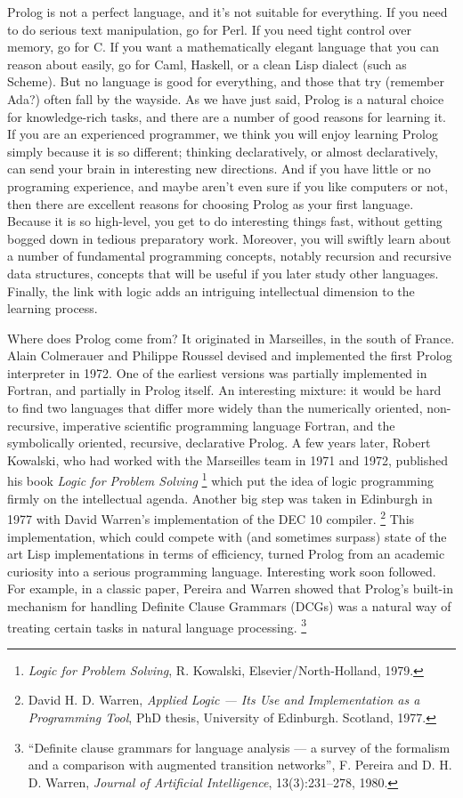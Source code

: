 Prolog is not a perfect language, and it's not suitable for
everything.  If you need to do serious text manipulation, go for Perl.
If you need tight control over memory, go for C. If you want a
mathematically elegant language that you can reason about easily, go
for Caml, Haskell, or a clean Lisp dialect (such as Scheme).  But no
language is good for everything, and those that try (remember Ada?)
often fall by the wayside. As we have just said, Prolog is a natural
choice for knowledge-rich tasks, and there are a number of good
reasons for learning it. If you are an experienced programmer, we
think you will enjoy learning Prolog simply because it is so
different; thinking declaratively, or almost declaratively, can send
your brain in interesting new directions.  And if you have little or
no programing experience, and maybe aren't even sure if you like
computers or not, then there are excellent reasons for choosing Prolog
as your first language. Because it is so high-level, you
get to do interesting things fast, without getting bogged down in
tedious preparatory work. Moreover, you will swiftly learn about a
number of fundamental programming concepts, notably recursion and
recursive data structures, concepts that will be useful if you later
study other languages. Finally, the link with logic adds an intriguing
intellectual dimension to the learning process.

Where does Prolog come from? It originated in Marseilles, in the south
of France. Alain Colmerauer and Philippe Roussel devised and
implemented the first Prolog interpreter in 1972.  One of the earliest
versions was partially implemented in Fortran, and partially in Prolog
itself. An interesting mixture: it would be hard to find two languages
that differ more widely than the numerically oriented, non-recursive,
imperative scientific programming language Fortran, and the
symbolically oriented, recursive, declarative Prolog.  A few
years later, Robert Kowalski, who had worked with the Marseilles team
in 1971 and 1972, published his book \textit{Logic for Problem
Solving}%
\footnote{\textit{Logic for Problem Solving}, R. Kowalski,
Elsevier/North-Holland, 1979.}  which put the idea of logic
programming firmly on the intellectual agenda.  Another big step was
taken in Edinburgh in 1977 with  David Warren's implementation of
the DEC 10 compiler.%
\footnote{David H. D. Warren, \textit{Applied Logic --- Its Use and
Implementation as a Programming Tool}, PhD thesis, University of
Edinburgh. Scotland, 1977.} This implementation, which could compete
with (and sometimes surpass) state of the art Lisp implementations in
terms of efficiency, turned Prolog from an academic curiosity into a
serious programming language.  Interesting work soon followed. For
example, in a classic paper, Pereira and Warren showed that Prolog's
built-in mechanism for handling Definite Clause Grammars (DCGs) was a
natural way of treating certain tasks in natural language processing.%
\footnote{
``Definite clause grammars for language
analysis --- a survey of the formalism and a comparison with augmented transition
networks'',  F. Pereira and D. H. D. Warren,
\textit{Journal of Artificial Intelligence}, 13(3):231--278, 1980.}

